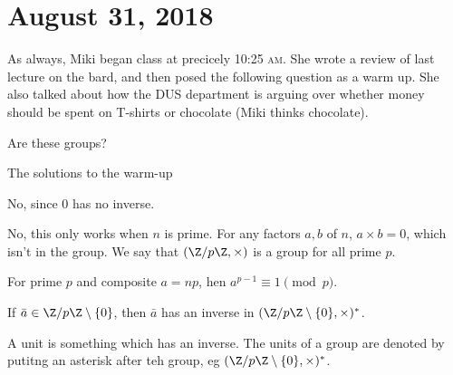 \section{August 31, 2018}

As always, Miki began class at precicely 10:25 \textsc{am}. She wrote a review of last lecture on the bard, and then posed the following question as a warm up. She also talked about how the DUS department is arguing over whether money should be spent on T-shirts or chocolate (Miki thinks chocolate).

\begin{problem}[Warm Up]
Are these groups?
\end{problem}

\begin{solution}
The solutions to the warm-up
\begin{subproof}
No, since $0$ has no inverse.
\end{subproof}

\begin{subproof}
No, this only works when $n$ is prime. For any factors $a,b$ of $n$, $a \times b = 0$, which isn't in the group. We say that $(\Z/p\Z, \times)$ is a group for all prime $p$.
\end{subproof}
\end{solution}

\begin{theorem}
For prime $p$ and composite $a = np$, hen $a^{p-1} \equiv 1 \pmod{p}$. 
\end{theorem}

\begin{lemma}
If $\bar{a} \in \Z/p\Z \setminus \{0\}$, then $\bar{a}$ has an inverse in $(\Z/p\Z \setminus \{0\}, \times)^*$.
\end{lemma}

\begin{definition}[Units]
A unit is something which has an inverse. The units of a group are denoted by putitng an asterisk after teh group, eg $(\Z/p\Z \setminus \{0\}, \times)^*$.
\end{definition}

